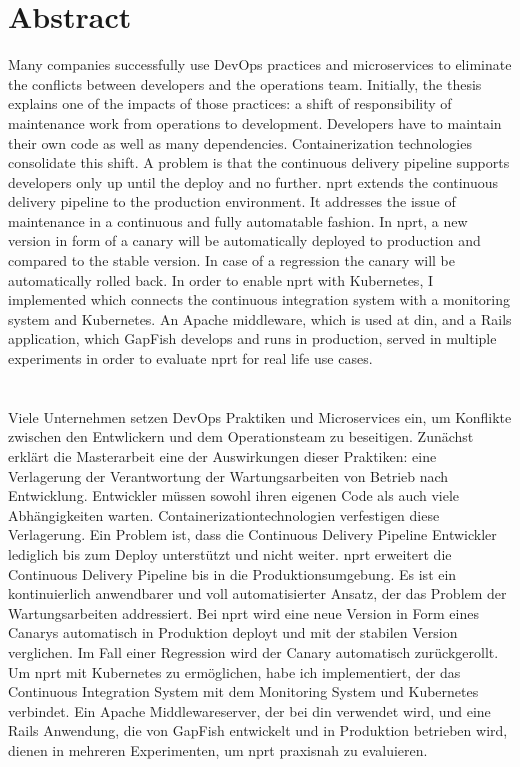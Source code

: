 \section*{Abstract}
Many companies successfully use DevOps practices and microservices to eliminate the
conflicts between developers and the operations team. Initially, the thesis explains one
of the impacts of those practices: a shift of responsibility of maintenance work from
operations to development. Developers have to maintain their own code as well as many
dependencies. Containerization technologies consolidate this shift. A problem is that the
continuous delivery pipeline supports developers only up until the deploy and no
further. \gls{nprt} extends the continuous delivery pipeline to the production
environment. It addresses the issue of maintenance in a continuous and fully automatable
fashion. In \gls{nprt}, a new version in form of a canary will be automatically deployed
to production and compared to the stable version. In case of a regression the canary will
be automatically rolled back. In order to enable \gls{nprt} with Kubernetes, I implemented
\deployer which connects the continuous integration system with a monitoring system and
Kubernetes. An Apache middleware, which is used at \gls{din}, and a Rails application,
which GapFish develops and runs in production, served in multiple experiments in order to
evaluate \gls{nprt} for real life use cases.
\\\\\\
Viele Unternehmen setzen DevOps Praktiken und Microservices ein, um Konflikte zwischen den
Entwlickern und dem Operationsteam zu beseitigen. Zunächst erklärt die Masterarbeit eine
der Auswirkungen dieser Praktiken: eine Verlagerung der Verantwortung der Wartungsarbeiten
von Betrieb nach Entwicklung. Entwickler müssen sowohl ihren eigenen Code als auch viele
Abhängigkeiten warten. Containerizationtechnologien verfestigen diese Verlagerung. Ein
Problem ist, dass die Continuous Delivery Pipeline Entwickler lediglich bis zum Deploy
unterstützt und nicht weiter. \gls{nprt} erweitert die Continuous Delivery Pipeline bis in
die Produktionsumgebung. Es ist ein kontinuierlich anwendbarer und voll automatisierter
Ansatz, der das Problem der Wartungsarbeiten addressiert. Bei \gls{nprt} wird eine neue
Version in Form eines Canarys automatisch in Produktion deployt und mit der stabilen
Version verglichen. Im Fall einer Regression wird der Canary automatisch zurückgerollt. Um
\gls{nprt} mit Kubernetes zu ermöglichen, habe ich \deployer implementiert, der das
Continuous Integration System mit dem Monitoring System und Kubernetes verbindet. Ein
Apache Middlewareserver, der bei \gls{din} verwendet wird, und eine Rails Anwendung, die
von GapFish entwickelt und in Produktion betrieben wird, dienen in mehreren Experimenten,
um \gls{nprt} praxisnah zu evaluieren.
